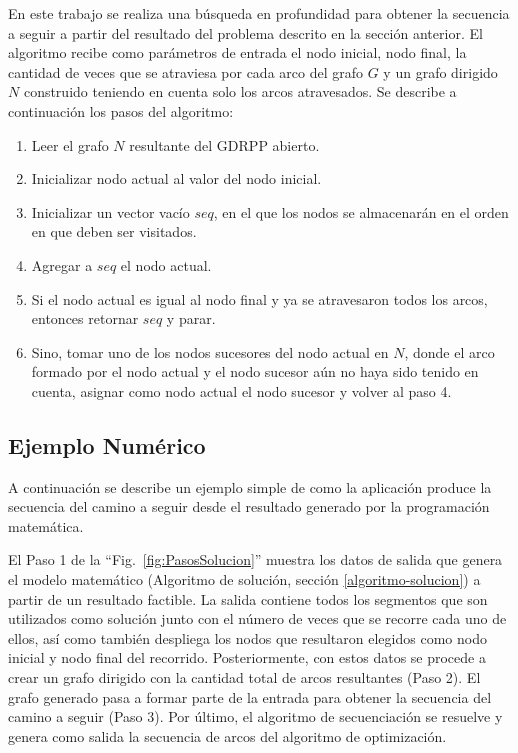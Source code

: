 En este trabajo se realiza una búsqueda en profundidad para obtener la secuencia a seguir a partir del resultado del problema descrito en la sección anterior. El algoritmo recibe como parámetros de entrada el nodo inicial, nodo final, la cantidad de veces que se atraviesa por cada arco del grafo $G$ y un grafo dirigido $N$ construido teniendo en cuenta solo los arcos atravesados. Se describe a continuación los pasos del algoritmo:

\begin{enumerate}
\item Leer el grafo $N$ resultante del GDRPP abierto. 
\item Inicializar nodo actual al valor del nodo inicial.
\item Inicializar un vector vacío $seq$, en el que los nodos se almacenarán en el orden en que deben ser visitados.
\item Agregar a $seq$ el nodo actual.
\item Si el nodo actual es igual al nodo final y ya se atravesaron todos los arcos, entonces retornar $seq$ y parar.
\item Sino, tomar uno de los nodos sucesores del nodo actual en $N$, donde el arco formado por el nodo actual y el nodo sucesor aún no haya sido tenido en cuenta, asignar como nodo actual el nodo sucesor y volver al paso 4.
\end{enumerate}

\subsection{Ejemplo Numérico}
A continuación se describe un ejemplo simple de como la aplicación produce la secuencia del camino a seguir desde el resultado generado por la programación matemática.

El Paso 1 de la ``Fig.~\ref{fig:PasosSolucion}'' muestra los datos de salida que genera el modelo matemático (Algoritmo  de  solución, sección \ref{algoritmo-solucion}) a partir de un resultado factible. La salida contiene todos los segmentos que son utilizados como solución junto con el número de veces que se recorre cada uno de ellos, así como también despliega los nodos que resultaron elegidos como nodo inicial y nodo final del recorrido. Posteriormente, con estos datos se procede a crear un grafo dirigido con la cantidad total de arcos resultantes (Paso 2). El grafo generado pasa a formar parte de la entrada para obtener la secuencia del camino a seguir (Paso 3). Por último, el algoritmo de secuenciación se resuelve y genera como salida la secuencia de arcos del algoritmo de optimización.

